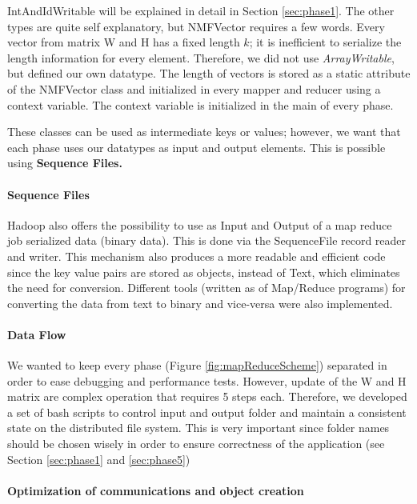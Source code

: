 \documentclass[a4paper,12pt]{article}
\begin{document}
IntAndIdWritable will be explained in detail in Section \ref{sec:phase1}.
The other types are quite self explanatory, but NMFVector requires a few words.
Every vector from matrix W and H has a fixed length $k$; it is inefficient to serialize the length information for every element.
Therefore, we did not use \textit{ArrayWritable}, but defined our own datatype.
The length of vectors is stored as a static attribute of the NMFVector class and initialized in every mapper and reducer using a context variable.
The context variable is initialized in the main of every phase.

These classes can be used as intermediate keys or values; however, we want that each phase uses our datatypes as input and output elements.
This is possible using \textbf{Sequence Files.}

\paragraph{Sequence Files}

Hadoop also offers the possibility to use as Input and Output of a map reduce job serialized data (binary data). 
This is done via the SequenceFile record reader and writer.
This mechanism also produces a more readable and efficient code since the key value pairs are stored as objects, instead of Text, which eliminates the need for conversion.
Different tools (written as of Map/Reduce programs) for converting the data from text to binary and vice-versa were also implemented.

\paragraph{Data Flow}

We wanted to keep every phase (Figure \ref{fig:mapReduceScheme}) separated in order to ease debugging and performance tests.
However, update of the W and H matrix are complex operation that requires 5 steps each.
Therefore, we developed a set of bash scripts to control input and output folder and maintain a consistent state on the distributed file system.
This is very important since folder names should be chosen wisely in order to ensure correctness of the application (see Section \ref{sec:phase1} and \ref{sec:phase5})

\paragraph{Optimization of communications and object creation}
\end{document}
